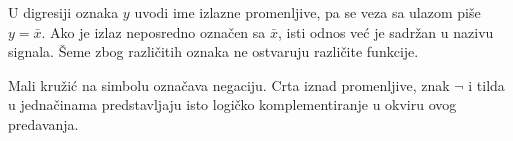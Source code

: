 
U digresiji oznaka \(y\) uvodi ime izlazne promenljive, pa se veza sa ulazom piše \(y=\bar{x}\). Ako je izlaz neposredno označen sa \(\bar{x}\), isti odnos već je sadržan u nazivu signala. Šeme zbog različitih oznaka ne ostvaruju različite funkcije.

Mali kružić na simbolu označava negaciju. Crta iznad promenljive, znak \(\neg\) i tilda u jednačinama predstavljaju isto logičko komplementiranje u okviru ovog predavanja.
